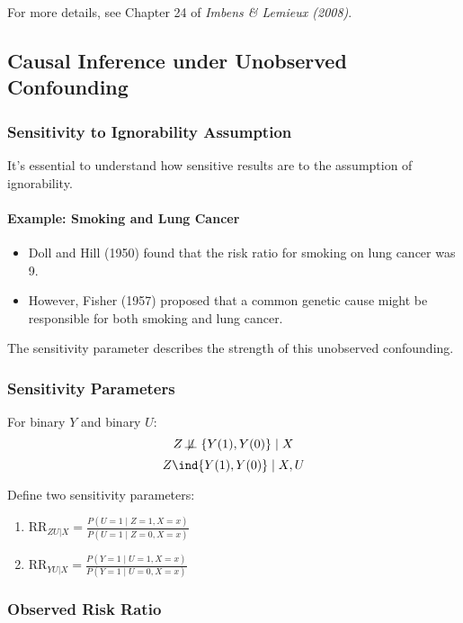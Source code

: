 For more details, see Chapter 24 of \emph{Imbens \& Lemieux (2008)}.

\subsection{Causal Inference under Unobserved Confounding}

\subsubsection{Sensitivity to Ignorability Assumption}

It's essential to understand how sensitive results are to the assumption of ignorability.

\paragraph{Example: Smoking and Lung Cancer}
\begin{itemize}
    \item Doll and Hill (1950) found that the risk ratio for smoking on lung cancer was 9.
    \item However, Fisher (1957) proposed that a common genetic cause might be responsible for both smoking and lung cancer.
\end{itemize}

The sensitivity parameter describes the strength of this unobserved confounding.

\subsubsection{Sensitivity Parameters}

For binary \(Y\) and binary \(U\):
\[
Z \not\!\perp\!\!\!\perp \{Y(1), Y(0)\} \mid X
\]
\[
Z \ind \{Y(1), Y(0)\} \mid X, U
\]

Define two sensitivity parameters:
\begin{enumerate}
    \item \(\text{RR}_{ZU|X} = \frac{P(U=1 \mid Z=1, X=x)}{P(U=1 \mid Z=0, X=x)}\)
    \item \(\text{RR}_{YU|X} = \frac{P(Y=1 \mid U=1, X=x)}{P(Y=1 \mid U=0, X=x)}\)
\end{enumerate}

\subsubsection{Observed Risk Ratio}

